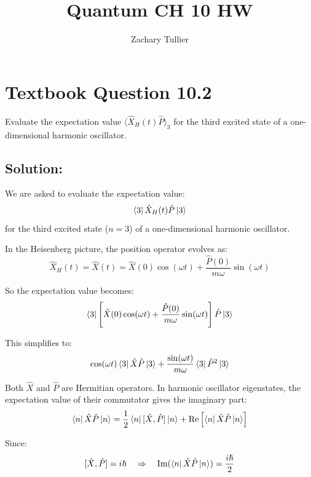 \documentclass[12pt]{article}
\begin{document}
\singlespacing  %
\title{Quantum CH 10 HW}

\author[1]{Zachary Tullier}
\date{}
\maketitle

\section{Textbook Question 10.2}
    Evaluate the expectation value $\langle \hat{X}_H(t) \hat{P} \rangle_3$ for the third excited state of a one-dimensional harmonic oscillator.

    \subsection{Solution:}
        We are asked to evaluate the expectation value:
        \[
            \bra{3} \hat{X}_H(t) \hat{P} \ket{3}
        \]
        for the third excited state (\(n = 3\)) of a one-dimensional harmonic oscillator.

        In the Heisenberg picture, the position operator evolves as:
        \[
            \hat{X}_H(t) = \hat{X}(t) = \hat{X}(0) \cos(\omega t) + \frac{\hat{P}(0)}{m\omega} \sin(\omega t)
        \]
        
        So the expectation value becomes:
        \[
            \bra{3} \left[ \hat{X}(0) \cos(\omega t) + \frac{\hat{P}(0)}{m\omega} \sin(\omega t) \right] \hat{P} \ket{3}
        \]
        
        This simplifies to:
        \[
            \cos(\omega t) \bra{3} \hat{X} \hat{P} \ket{3} + \frac{\sin(\omega t)}{m\omega} \bra{3} \hat{P}^2 \ket{3}
        \]
        
        Both \(\hat{X}\) and \(\hat{P}\) are Hermitian operators. In harmonic oscillator eigenstates, the expectation value of their commutator gives the imaginary part:
        \[
            \bra{n} \hat{X} \hat{P} \ket{n} = \frac{1}{2} \bra{n} [\hat{X}, \hat{P}] \ket{n} + \Re\left[ \bra{n} \hat{X} \hat{P} \ket{n} \right]
        \]
        
        Since:
        \[
            [\hat{X}, \hat{P}] = i\hbar \quad \Rightarrow \quad \Im(\bra{n} \hat{X} \hat{P} \ket{n}) = \frac{i\hbar}{2}
        \]
        
\end{document}
